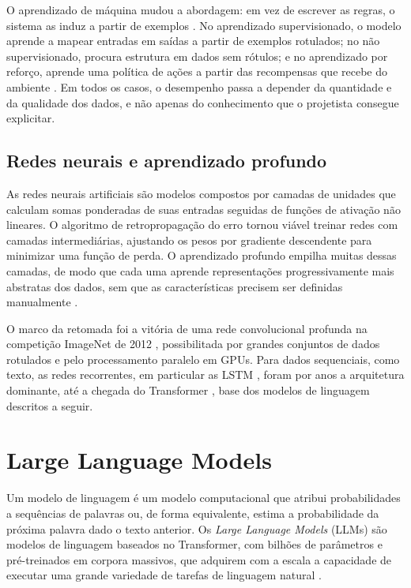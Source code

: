 O aprendizado de máquina mudou a abordagem: em vez de escrever as regras, o sistema as induz a partir de exemplos \cite{Bishop2006}. No aprendizado supervisionado, o modelo aprende a mapear entradas em saídas a partir de exemplos rotulados; no não supervisionado, procura estrutura em dados sem rótulos; e no aprendizado por reforço, aprende uma política de ações a partir das recompensas que recebe do ambiente \cite{Russell2020}. Em todos os casos, o desempenho passa a depender da quantidade e da qualidade dos dados, e não apenas do conhecimento que o projetista consegue explicitar.

\subsection{Redes neurais e aprendizado profundo}

As redes neurais artificiais são modelos compostos por camadas de unidades que calculam somas ponderadas de suas entradas seguidas de funções de ativação não lineares. O algoritmo de retropropagação do erro \cite{Rumelhart1986} tornou viável treinar redes com camadas intermediárias, ajustando os pesos por gradiente descendente para minimizar uma função de perda. O aprendizado profundo empilha muitas dessas camadas, de modo que cada uma aprende representações progressivamente mais abstratas dos dados, sem que as características precisem ser definidas manualmente \cite{LeCun2015,Goodfellow2016}.

O marco da retomada foi a vitória de uma rede convolucional profunda na competição ImageNet de 2012 \cite{Krizhevsky2012}, possibilitada por grandes conjuntos de dados rotulados e pelo processamento paralelo em GPUs. Para dados sequenciais, como texto, as redes recorrentes, em particular as LSTM \cite{Hochreiter1997}, foram por anos a arquitetura dominante, até a chegada do Transformer \cite{Vaswani2017}, base dos modelos de linguagem descritos a seguir.

\section{Large Language Models}
\label{sec:llm}

Um modelo de linguagem é um modelo computacional que atribui probabilidades a sequências de palavras ou, de forma equivalente, estima a probabilidade da próxima palavra dado o texto anterior. Os \textit{Large Language Models} (LLMs) são modelos de linguagem baseados no Transformer, com bilhões de parâmetros e pré-treinados em corpora massivos, que adquirem com a escala a capacidade de executar uma grande variedade de tarefas de linguagem natural \cite{Zhao2023}.

